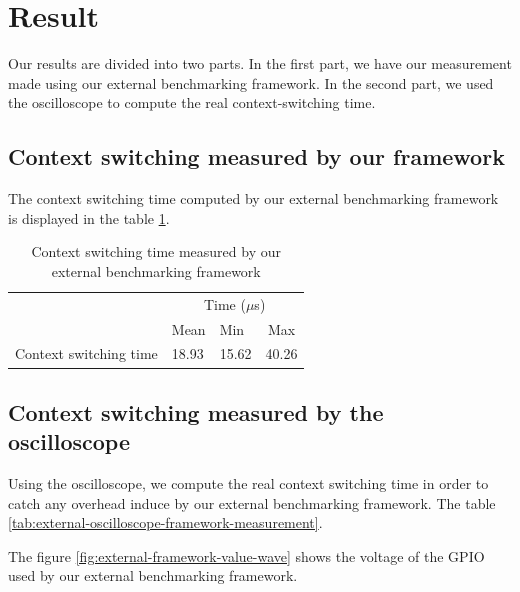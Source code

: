 \section{Result}

Our results are divided into two parts.
In the first part, we have our measurement made using our external benchmarking framework.
In the second part, we used the oscilloscope to compute the real context-switching time.

\subsection{Context switching measured by our framework}
The context switching time computed by our external benchmarking framework is displayed in the table \ref{tab:external-framework-measurement}.

\begin{table}[!ht]
  \centering
  \begin{tabular}{llll}
                        & \multicolumn{3}{c}{Time ($\mu$s)}                             \\ \cline{2-4} 
                        & \multicolumn{1}{c}{Mean} & Min  & \multicolumn{1}{c}{Max} \\ \cline{2-4} 
  Context switching time & 18.93                     & 15.62 & 40.26                    \\
  \end{tabular}
  \caption{Context switching time measured by our external benchmarking framework}
  \label{tab:external-framework-measurement}
\end{table}

\subsection{Context switching measured by the oscilloscope}
Using the oscilloscope, we compute the real context switching time in order to catch any overhead induce by our external benchmarking framework.
The table \ref{tab:external-oscilloscope-framework-measurement}.

The figure \ref{fig:external-framework-value-wave} shows the voltage of the GPIO used by our external benchmarking framework.

